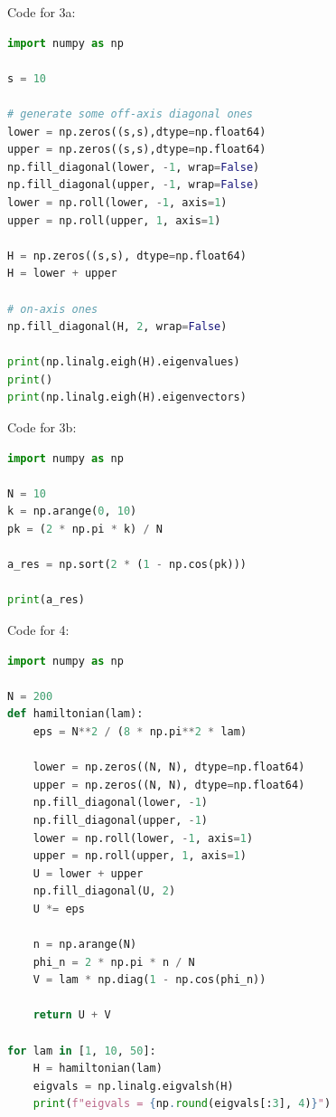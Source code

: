     \newpage
    \begin{callout}{Code for 3a:}

        \begin{lstlisting}[language=Python]
import numpy as np

s = 10

# generate some off-axis diagonal ones
lower = np.zeros((s,s),dtype=np.float64)
upper = np.zeros((s,s),dtype=np.float64)
np.fill_diagonal(lower, -1, wrap=False)
np.fill_diagonal(upper, -1, wrap=False)
lower = np.roll(lower, -1, axis=1)
upper = np.roll(upper, 1, axis=1)

H = np.zeros((s,s), dtype=np.float64)
H = lower + upper

# on-axis ones
np.fill_diagonal(H, 2, wrap=False)

print(np.linalg.eigh(H).eigenvalues)
print()
print(np.linalg.eigh(H).eigenvectors)
        \end{lstlisting}

    \end{callout}

    \begin{callout}{Code for 3b:}

        \begin{lstlisting}[language=Python]
import numpy as np 

N = 10
k = np.arange(0, 10)
pk = (2 * np.pi * k) / N

a_res = np.sort(2 * (1 - np.cos(pk)))

print(a_res)
        \end{lstlisting}

    \end{callout}

\newpage
\begin{callout}{Code for 4:}

        \begin{lstlisting}[language=Python]
import numpy as np

N = 200
def hamiltonian(lam):
    eps = N**2 / (8 * np.pi**2 * lam)

    lower = np.zeros((N, N), dtype=np.float64)
    upper = np.zeros((N, N), dtype=np.float64)
    np.fill_diagonal(lower, -1)
    np.fill_diagonal(upper, -1)
    lower = np.roll(lower, -1, axis=1)
    upper = np.roll(upper, 1, axis=1)
    U = lower + upper
    np.fill_diagonal(U, 2)
    U *= eps

    n = np.arange(N)
    phi_n = 2 * np.pi * n / N
    V = lam * np.diag(1 - np.cos(phi_n))

    return U + V

for lam in [1, 10, 50]:
    H = hamiltonian(lam)
    eigvals = np.linalg.eigvalsh(H)
    print(f"eigvals = {np.round(eigvals[:3], 4)}")
        \end{lstlisting}

\end{callout}

